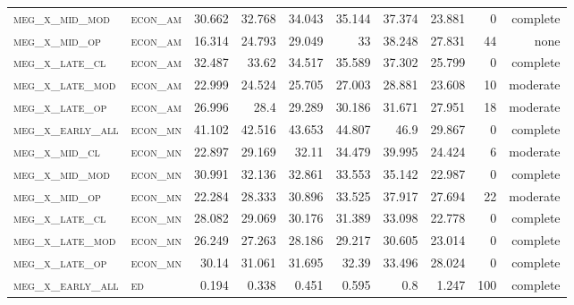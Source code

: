 \begin{landscape}
\begin{center}
\begin{footnotesize}
\begin{longtable}{llrrrrr|rrr}
\textsc{meg\_x\_mid\_mod  } & \textsc{econ\_am  }    & 30.662   & 32.768   & 34.043   & 35.144   & 37.374    & 23.881        & 0             & complete            \\
\textsc{meg\_x\_mid\_op   } & \textsc{econ\_am  }    & 16.314   & 24.793   & 29.049   & 33       & 38.248    & 27.831        & 44            & none             \\
\textsc{meg\_x\_late\_cl  } & \textsc{econ\_am  }    & 32.487   & 33.62    & 34.517   & 35.589   & 37.302    & 25.799        & 0             & complete            \\
\textsc{meg\_x\_late\_mod } & \textsc{econ\_am  }    & 22.999   & 24.524   & 25.705   & 27.003   & 28.881    & 23.608        & 10            & moderate             \\
\textsc{meg\_x\_late\_op  } & \textsc{econ\_am  }    & 26.996   & 28.4     & 29.289   & 30.186   & 31.671    & 27.951        & 18            & moderate             \\
\textsc{meg\_x\_early\_all} & \textsc{econ\_mn  }    & 41.102   & 42.516   & 43.653   & 44.807   & 46.9      & 29.867        & 0             & complete            \\
\textsc{meg\_x\_mid\_cl   } & \textsc{econ\_mn  }    & 22.897   & 29.169   & 32.11    & 34.479   & 39.995    & 24.424        & 6             & moderate             \\
\textsc{meg\_x\_mid\_mod  } & \textsc{econ\_mn  }    & 30.991   & 32.136   & 32.861   & 33.553   & 35.142    & 22.987        & 0             & complete            \\
\textsc{meg\_x\_mid\_op   } & \textsc{econ\_mn  }    & 22.284   & 28.333   & 30.896   & 33.525   & 37.917    & 27.694        & 22            & moderate             \\
\textsc{meg\_x\_late\_cl  } & \textsc{econ\_mn  }    & 28.082   & 29.069   & 30.176   & 31.389   & 33.098    & 22.778        & 0             & complete            \\
\textsc{meg\_x\_late\_mod } & \textsc{econ\_mn  }    & 26.249   & 27.263   & 28.186   & 29.217   & 30.605    & 23.014        & 0             & complete            \\
\textsc{meg\_x\_late\_op  } & \textsc{econ\_mn  }    & 30.14    & 31.061   & 31.695   & 32.39    & 33.496    & 28.024        & 0             & complete            \\
\textsc{meg\_x\_early\_all} & \textsc{ed        }    & 0.194    & 0.338    & 0.451    & 0.595    & 0.8       & 1.247         & 100           & complete             \\

\end{longtable}
\end{footnotesize}
\end{center}
\end{landscape}
